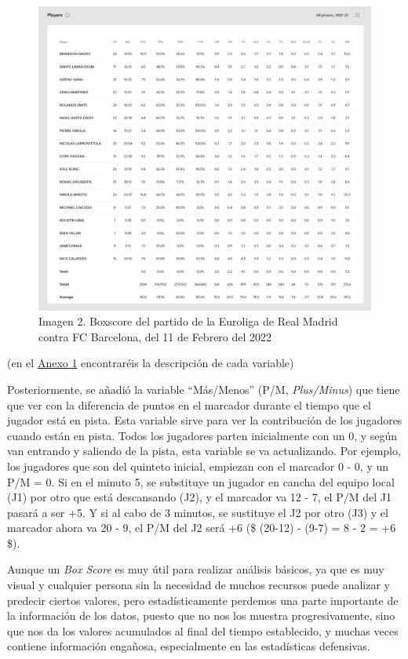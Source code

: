 \documentclass[
]{article}
\begin{document}
\begin{figure}
\centering
\includegraphics{imagenes/BoxScore2022_EuroligaBarca.JPG}
\caption{Imagen 2. Boxscore del partido de la Euroliga de Real Madrid
contra FC Barcelona, del 11 de Febrero del 2022}
\end{figure}

(en el
\protect\hyperlink{Anexo-1:-Descripciuxf3n-de-las-variables}{Anexo 1}
encontraréis la descripción de cada variable)

Posteriormente, se añadió la variable ``Más/Menos'' (P/M,
\emph{Plus/Minus}) que tiene que ver con la diferencia de puntos en el
marcador durante el tiempo que el jugador está en pista. Esta variable
sirve para ver la contribución de los jugadores cuando están en pista.
Todos los jugadores parten inicialmente con un 0, y según van entrando y
saliendo de la pista, esta variable se va actualizando. Por ejemplo, los
jugadores que son del quinteto inicial, empiezan con el marcador 0 - 0,
y un P/M = 0. Si en el minuto 5, se substituye un jugador en cancha del
equipo local (J1) por otro que está descansando (J2), y el marcador va
12 - 7, el P/M del J1 pasará a ser +5. Y si al cabo de 3 minutos, se
sustituye el J2 por otro (J3) y el marcador ahora va 20 - 9, el P/M del
J2 será +6 (\$ (20-12) - (9-7) = 8 - 2 = +6 \$).

Aunque un \emph{Box Score} es muy útil para realizar análisis básicos,
ya que es muy visual y cualquier persona sin la necesidad de muchos
recursos puede analizar y predecir ciertos valores, pero
estadísticamente perdemos una parte importante de la información de los
datos, puesto que no nos los muestra progresivamente, sino que nos da
los valores acumulados al final del tiempo establecido, y muchas veces
contiene información engañosa, especialmente en las estadísticas
defensivas.
\end{document}
